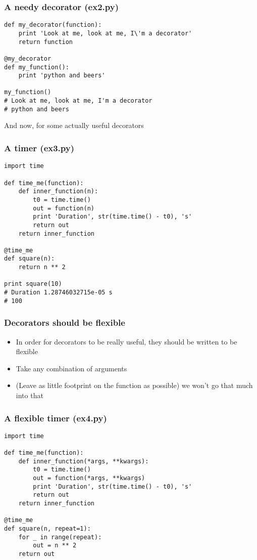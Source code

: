 \documentclass{beamer}
\begin{document}
\begin{frame}[fragile]
  \frametitle{A needy decorator (ex2.py)}
\begin{verbatim}
def my_decorator(function):
    print 'Look at me, look at me, I\'m a decorator'
    return function

@my_decorator
def my_function():
    print 'python and beers'

my_function()
# Look at me, look at me, I'm a decorator
# python and beers
\end{verbatim}
\begin{block}{\vspace*{-3ex}}
  And now, for some actually useful decorators
\end{block}
\end{frame}

\begin{frame}[fragile]
  \frametitle{A timer (ex3.py)}
\begin{verbatim}
import time

def time_me(function):
    def inner_function(n):
        t0 = time.time()
        out = function(n)
        print 'Duration', str(time.time() - t0), 's'
        return out
    return inner_function

@time_me
def square(n):
    return n ** 2

print square(10)
# Duration 1.28746032715e-05 s
# 100
\end{verbatim}
\end{frame}

\begin{frame}
  \frametitle{Decorators should be flexible}
  \begin{itemize}
  \item In order for decorators to be really useful, they should be written to
    be flexible
  \item Take any combination of arguments
  \item (Leave as little footprint on the function as possible) we won't go
    that much into that
  \end{itemize}
\end{frame}

\begin{frame}[fragile]
  \frametitle{A flexible timer (ex4.py)}
\begin{verbatim}
import time

def time_me(function):
    def inner_function(*args, **kwargs):
        t0 = time.time()
        out = function(*args, **kwargs)
        print 'Duration', str(time.time() - t0), 's'
        return out
    return inner_function

@time_me
def square(n, repeat=1):
    for _ in range(repeat):
        out = n ** 2
    return out
\end{verbatim}
\end{frame}
\end{document}
